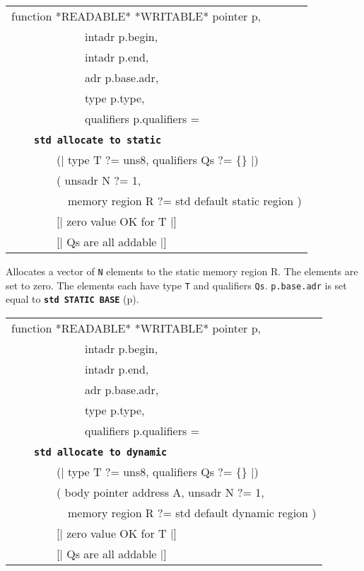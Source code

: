 \documentclass[12pt]{article}
\makeatletter
\newcommand{\TT}[1]{{\tt \bfseries #1}}
\newcommand{\ttstdkey}[1]{\TT{std #1}\index{#1@{\tt std #1}}}
\newcommand{\pagref}[1]{p\pageref{#1}}
\newenvironment{indpar}[1][0.3in]%
	{\begin{list}{}%
		     {\setlength{\itemsep}{0in}%
		      \setlength{\topsep}{0in}%
		      \setlength{\parsep}{1ex}%
		      \setlength{\labelwidth}{#1}%
		      \setlength{\leftmargin}{#1}%
		      \addtolength{\leftmargin}{\labelsep}}%
	 \item}%
	{\end{list}}
\makeatother
\begin{document}
\begin{indpar}
{\tt\begin{tabular}{@{}l}
function *READABLE* *WRITABLE* pointer p, \\
~~~~~~~~~~~~~intadr p.begin, \\
~~~~~~~~~~~~~intadr p.end, \\
~~~~~~~~~~~~~adr p.base.adr, \\
~~~~~~~~~~~~~type p.type, \\
~~~~~~~~~~~~~qualifiers p.qualifiers = \\
~~~~\ttstdkey{allocate to static} \\
~~~~~~~~(| type T ?= uns8, qualifiers Qs ?= \{\} |) \\
~~~~~~~~( unsadr N ?= 1, \\
~~~~~~~~~~memory region R ?= std default static region ) \\
~~~~~~~~[| zero value OK for T |] \\
~~~~~~~~[| Qs are all addable |] \\
\end{tabular}}\label{POINTER-ALLOCATE-TO-STATIC}

\begin{indpar}
Allocates a vector of {\tt N} elements to the static memory region R.
The elements are set to zero.
The elements each have type {\tt T} and qualifiers {\tt Qs}.
{\tt p.base.adr} is set equal to \TT{std STATIC BASE} (\pagref{STATIC-BASE}).
\end{indpar}

{\tt\begin{tabular}{@{}l}
function *READABLE* *WRITABLE* pointer p, \\
~~~~~~~~~~~~~intadr p.begin, \\
~~~~~~~~~~~~~intadr p.end, \\
~~~~~~~~~~~~~adr p.base.adr, \\
~~~~~~~~~~~~~type p.type, \\
~~~~~~~~~~~~~qualifiers p.qualifiers = \\
~~~~\ttstdkey{allocate to dynamic} \\
~~~~~~~~(| type T ?= uns8, qualifiers Qs ?= \{\} |) \\
~~~~~~~~( body pointer address A, unsadr N ?= 1, \\
~~~~~~~~~~memory region R ?= std default dynamic region ) \\
~~~~~~~~[| zero value OK for T |] \\
~~~~~~~~[| Qs are all addable |] \\
\end{tabular}}\label{POINTER-ALLOCATE-TO-DYNAMIC}


\end{indpar}
\end{document}
